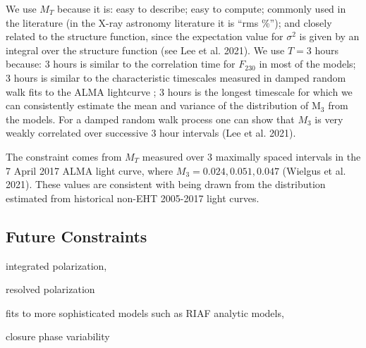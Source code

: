 We use $M_T$ because it is: easy to describe; easy to compute;
commonly used in the literature (in the X-ray astronomy literature it
is ``rms \%''); and closely related to the structure function, since
the expectation value for $\sigma^2$ is given by an integral over the
structure function (see Lee et al. 2021).
We use $T = 3$ hours because: 3 hours is similar to the correlation
time for $F_{230}$ in most of the models; 3 hours is similar to the
characteristic timescales measured in damped random walk fits to the
ALMA lightcurve \citep[see Table 10 of][]{wielgus2021}; 3 hours is the
longest timescale for which we can consistently estimate the mean and
variance of the distribution of M$_3$ from the models.
For a damped random walk process one can show that $M_3$ is very weakly
correlated over successive 3 hour intervals (Lee et al. 2021).

The constraint comes from $M_T$ measured over 3 maximally spaced intervals
in the 7 April 2017 ALMA light curve, where $M_3 = 0.024, 0.051,
0.047$ (Wielgus et al. 2021). These values are consistent with being drawn from the distribution estimated from historical non-EHT 2005-2017 light curves.

\subsection{Future Constraints}

integrated polarization,

resolved polarization

fits to more sophisticated models such as RIAF analytic models,

closure phase variability
